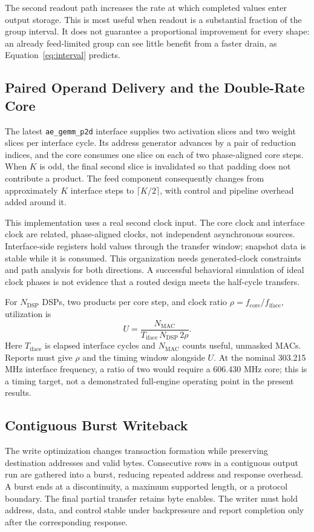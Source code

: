 \documentclass[10pt,conference,letterpaper]{IEEEtran}
\begin{document}
The second readout path increases the rate at which completed values enter output storage. This is most useful when readout is a substantial fraction of the group interval. It does not guarantee a proportional improvement for every shape: an already feed-limited group can see little benefit from a faster drain, as Equation~\ref{eq:interval} predicts.

\subsection{Paired Operand Delivery and the Double-Rate Core}
The latest \texttt{ae\_gemm\_p2d} interface supplies two activation slices and two weight slices per interface cycle. Its address generator advances by a pair of reduction indices, and the core consumes one slice on each of two phase-aligned core steps. When $K$ is odd, the final second slice is invalidated so that padding does not contribute a product. The feed component consequently changes from approximately $K$ interface steps to $\lceil K/2\rceil$, with control and pipeline overhead added around it.

This implementation uses a real second clock input. The core clock and interface clock are related, phase-aligned clocks, not independent asynchronous sources. Interface-side registers hold values through the transfer window; snapshot data is stable while it is consumed. This organization needs generated-clock constraints and path analysis for both directions. A successful behavioral simulation of ideal clock phases is not evidence that a routed design meets the half-cycle transfers.

For $N_{\mathrm{DSP}}$ DSPs, two products per core step, and clock ratio $\rho=f_{\mathrm{core}}/f_{\mathrm{iface}}$, utilization is
\begin{equation}
U=\frac{N_{\mathrm{MAC}}}{T_{\mathrm{iface}}\,N_{\mathrm{DSP}}\,2\rho}.
\label{eq:util}
\end{equation}
Here $T_{\mathrm{iface}}$ is elapsed interface cycles and $N_{\mathrm{MAC}}$ counts useful, unmasked MACs. Reports must give $\rho$ and the timing window alongside $U$. At the nominal 303.215 MHz interface frequency, a ratio of two would require a 606.430 MHz core; this is a timing target, not a demonstrated full-engine operating point in the present results.

\subsection{Contiguous Burst Writeback}
The write optimization changes transaction formation while preserving destination addresses and valid bytes. Consecutive rows in a contiguous output run are gathered into a burst, reducing repeated address and response overhead. A burst ends at a discontinuity, a maximum supported length, or a protocol boundary. The final partial transfer retains byte enables. The writer must hold address, data, and control stable under backpressure and report completion only after the corresponding response.
\end{document}
